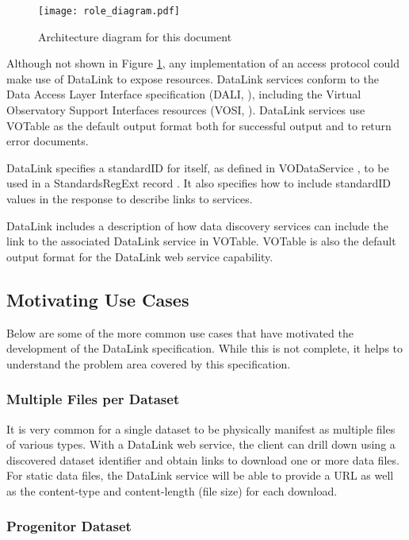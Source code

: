 \documentclass[11pt,a4paper]{ivoa}
\begin{document}
\begin{figure}[ht]
\centering
\texttt{[image: role\_diagram.pdf]}
\caption{Architecture diagram for this document}
\label{fig:archdiag}
\end{figure}

Although not shown in Figure \ref{fig:archdiag},
any implementation of an access protocol could
make use of DataLink to expose resources. DataLink services conform to
the Data Access Layer Interface specification
(DALI, \citet{2013ivoa.spec.1129D}),
including the
Virtual Observatory Support Interfaces resources
(VOSI, \citet{2011ivoa.spec.0531G}).
DataLink services use VOTable \citep{2013ivoa.spec.0920O}
as the default output format both for successful
output and to return error documents.

DataLink specifies a standardID for itself, as defined in VODataService
\citep{2010ivoa.spec.1202P},
to be used in a StandardsRegExt record \citep{2012ivoa.spec.0508H}.
It also specifies how to
include standardID values in the response to describe links to services.

DataLink includes a description of how data discovery services can include
the link to the associated DataLink service in VOTable. VOTable is
also the default output format for the DataLink web service capability.


\subsection{Motivating Use Cases}

Below are some of the more common use cases that have motivated the
development of the DataLink specification. While this is not complete,
it helps to understand the problem area covered by this specification.


\subsubsection{Multiple Files per Dataset}
\label{sec:useMultiFile}

It is very common for a single dataset to be physically manifest as
multiple files of various types. With a DataLink web service, the client
can drill down using a discovered dataset identifier and obtain links to
download one or more data files.  For static data files, the DataLink
service will be able to provide a URL as well as the content-type and
content-length (file size) for each download.


\subsubsection{Progenitor Dataset}
\end{document}
